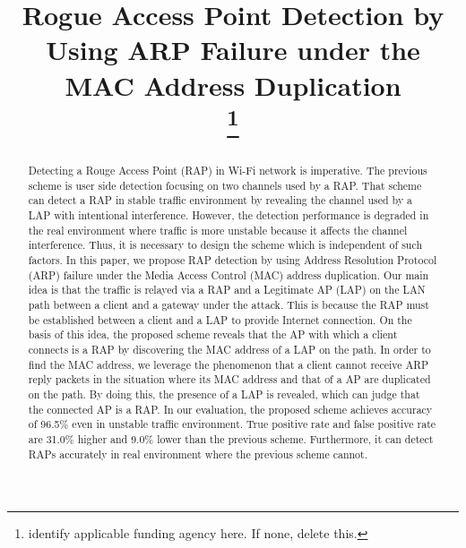 \documentclass[conference]{IEEEtran}
\begin{document}
\title{Rogue Access Point Detection by Using ARP Failure under the MAC Address Duplication\\
\thanks{identify applicable funding agency here. If none, delete this.}
}

\author{

}
\maketitle
\begin{abstract}
Detecting a Rouge Access Point (RAP) in Wi-Fi network is imperative.
The previous scheme is user side detection focusing on two channels used by a RAP.
That scheme can detect a RAP in stable traffic environment by revealing the channel used by a LAP with intentional interference.
However, the detection performance is degraded in the real environment where traffic is more unstable because it affects the channel interference.
Thus, it is necessary to design the scheme which is independent of such factors.
In this paper, we propose RAP detection by using Address Resolution Protocol (ARP) failure under the Media Access Control (MAC) address duplication.
Our main idea is that the traffic is relayed via a RAP and a Legitimate AP (LAP) on the LAN path between a client and a gateway under the attack.
This is because the RAP must be established between a client and a LAP to provide Internet connection.
On the basis of this idea, the proposed scheme reveals that the AP with which a client connects is a RAP by discovering the MAC address of a LAP on the path.
In order to find the MAC address, we leverage the phenomenon that a client cannot receive ARP reply packets in the situation where its MAC address and that of a AP are duplicated on the path.
By doing this, the presence of a LAP is revealed, which can judge that the connected AP is a RAP.
In our evaluation, the proposed scheme achieves accuracy of 96.5\% even in unstable traffic environment.
True positive rate and false positive rate are 31.0\% higher and 9.0\% lower than the previous scheme.
Furthermore, it can detect RAPs accurately in real environment where the previous scheme cannot.
\end{abstract}
\end{document}
